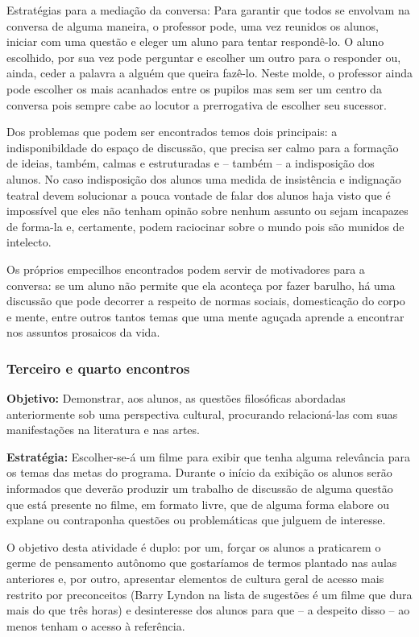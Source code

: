 \documentclass[12pt,a4paper]{article}
\begin{document}
	Estratégias para a mediação da conversa: Para garantir que todos 
	se envolvam na conversa de alguma maneira, o professor pode, uma 
	vez reunidos os alunos, iniciar com uma questão e eleger um aluno 
	para tentar respondê-lo. O aluno escolhido, por sua vez pode 
	perguntar e escolher um outro para o responder ou, ainda, ceder a 
	palavra a alguém que queira fazê-lo. Neste molde, o professor 
	ainda pode escolher os mais acanhados entre os pupilos mas sem 
	ser um centro da conversa pois sempre cabe ao locutor a 
	prerrogativa de escolher seu sucessor.
	
	Dos problemas que podem ser encontrados temos dois principais:
	a indisponibildade do espaço de discussão, que precisa ser calmo 
	para a formação de ideias, também, calmas e estruturadas e -- 
	também -- a indisposição dos alunos. No caso indisposição dos 
	alunos uma medida de insistência e indignação teatral devem 
	solucionar a pouca vontade de falar dos alunos haja visto que é 
	impossível que eles não tenham opinão sobre nenhum assunto ou 
	sejam incapazes de forma-la e, certamente, podem raciocinar sobre 
	o mundo pois são munidos de intelecto.

	Os próprios empecilhos encontrados podem servir de motivadores 
	para a conversa: se um aluno não permite que ela aconteça por 
	fazer barulho, há uma discussão que pode decorrer a respeito 
	de normas sociais, domesticação do corpo e mente, entre outros 
	tantos temas que uma mente aguçada aprende a encontrar nos 
	assuntos prosaicos da vida.

	\subsubsection{Terceiro e quarto encontros}
	
	\textbf{Objetivo:} Demonstrar, aos alunos, as questões 
	filosóficas abordadas anteriormente sob uma perspectiva 
	cultural, procurando relacioná-las com suas manifestações 
	na literatura e nas artes. 

	\textbf{Estratégia:}
	Escolher-se-á um filme para exibir que tenha alguma relevância 
	para os temas das metas do programa. Durante o início da 
	exibição os alunos serão informados que deverão produzir um 
	trabalho de discussão de alguma questão que está presente no 
	filme, em formato livre, que de alguma forma elabore ou 
	explane ou contraponha questões ou problemáticas que julguem
	de interesse. 

	O objetivo desta atividade é duplo: por um, forçar os alunos 
	a praticarem o germe de pensamento autônomo que gostaríamos 
	de termos plantado nas aulas anteriores e, por outro, apresentar
	elementos de cultura geral de acesso mais restrito por 
	preconceitos (Barry Lyndon na lista de sugestões é um filme 
	que dura mais do que três horas) e desinteresse dos alunos para 
	que -- a despeito disso -- ao menos tenham o acesso à referência. 
\end{document}
